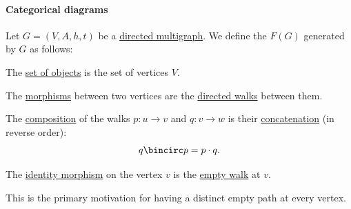 \paragraph{Categorical diagrams}

\begin{definition}\label{def:free_category}
  Let \( G = (V, A, h, t) \) be a \hyperref[def:directed_multigraph]{directed multigraph}. We define the  \( F(G) \) generated by \( G \) as follows:
  \begin{thmenum}[series=def:free_category]
     The \hyperref[def:category/objects]{set of objects} is the set of vertices \( V \).

     The \hyperref[def:category/morphisms]{morphisms} between two vertices are the \hyperref[def:graph_walk/directed]{directed walks} between them.

     The \hyperref[def:category/composition]{composition} of the walks \( p: u \to v \) and \( q: v \to w \) is their \hyperref[def:graph_walk/concatenation]{concatenation} (in reverse order):
    \begin{equation*}
      q \bincirc p = p \cdot q.
    \end{equation*}

     The \hyperref[def:category/identity]{identity morphism} on the vertex \( v \) is the \hyperref[def:graph_walk/empty]{empty walk} at \( v \).

    This is the primary motivation for having a distinct empty path at every vertex.
  \end{thmenum}


\end{definition}
